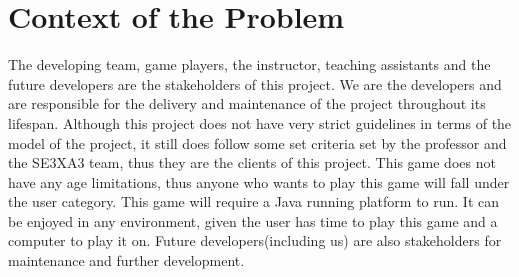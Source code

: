 \documentclass{article}
\begin{document}
\section{Context of the Problem}
The developing team, game players, the instructor, teaching assistants and the
future developers are the stakeholders of this project. We are the developers
and are responsible for the delivery and maintenance of the project
throughout its lifespan. Although this project does not have very strict
guidelines in terms of the model of the project, it still does follow some set
criteria set by the professor and the SE3XA3 team, thus they are the clients of
this project. This game does not have any age limitations, thus anyone who wants
to play this game will fall under the user category. This game will require a
Java running platform to run. It can be enjoyed in any environment, given the
user has time to play this game and a computer to play it on. Future
developers(including us) are also stakeholders for maintenance and further
development.\\
\end{document}
